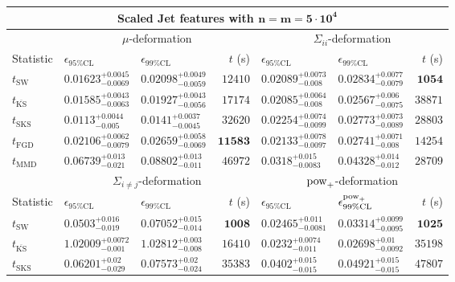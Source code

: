 \begin{tabular}{l|llr|llr}
	\toprule
	\multicolumn{7}{c}{{\bf Scaled Jet features with $\mathbf{n=m=5\cdot 10^{4}}$}} \\
	\toprule
	\multicolumn{1}{c}{} & \multicolumn{3}{c}{$\mu$-deformation} & \multicolumn{3}{c}{$\Sigma_{ii}$-deformation} \\
	Statistic & $\epsilon_{95\%\mathrm{CL}}$ & $\epsilon_{99\%\mathrm    {CL}}$ & $t$ (s) & $\epsilon_{95\%\mathrm{CL}}$ & $\epsilon_{99\%\mathrm{CL}}$ & $t$ (s) \\
	\midrule
	$t_{\mathrm{SW}}$ & $0.01623_{-0.0069}^{+0.0045}$ & $0.02098_{-0.0059}^{+0.0049}$ & $12410$ & $0.02089_{-0.008}^{+0.0073}$ & $0.02834_{-0.0079}^{+0.0077}$ & ${\mathbf{1054}}$ \\
	$t_{\overline{\mathrm{KS}}}$ & $0.01585_{-0.0063}^{+0.0043}$ & $0.01927_{-0.0056}^{+0.0043}$ & $17174$ & ${\mathbf{0.02085_{-0.008}^{+0.0064}}}$ & ${\mathbf{0.02567_{-0.0075}^{+0.006}}}$ & $38871$ \\
	$t_{\mathrm{SKS}}$ & ${\mathbf{0.0113_{-0.005}^{+0.0044}}}$ & ${\mathbf{0.0141_{-0.0045}^{+0.0037}}}$ & $32620$ & $0.02254_{-0.0099}^{+0.0074}$ & $0.02773_{-0.0089}^{+0.0073}$ & $28803$ \\
	$t_{\mathrm{FGD}}$ & $0.02106_{-0.0079}^{+0.0062}$ & $0.02659_{-0.0069}^{+0.0058}$ & ${\mathbf{11583}}$ & $0.02133_{-0.0097}^{+0.0078}$ & $0.02741_{-0.008}^{+0.0071}$ & $14254$ \\
	$t_{\mathrm{MMD}}$ & $0.06739_{-0.021}^{+0.013}$ & $0.08802_{-0.011}^{+0.013}$ & $46972$ & $0.0318_{-0.0083}^{+0.015}$ & $0.04328_{-0.012}^{+0.014}$ & $28709$ \\
	\toprule
	\multicolumn{1}{c}{} & \multicolumn{3}{c}{$\Sigma_{i\neq j}$-deformation} & \multicolumn{3}{c}{$\rm{pow}_{+}$-deformation} \\
	Statistic & $\epsilon_{95\%\mathrm{CL}}$ & $\epsilon_{99\%\mathrm{CL}}$ & $t$ (s) & $\epsilon_{95\%\mathrm{CL}}$ & $\epsilon^{\rm   {pow}_{+}}_{99\%\mathrm{CL}}$ & $t$ (s) \\
	\midrule
	$t_{\mathrm{SW}}$ & $0.0503_{-0.019}^{+0.016}$ & $0.07052_{-0.014}^{+0.015}$ & ${\mathbf{1008}}$ & $0.02465_{-0.0081}^{+0.011}$ & $0.03314_{-0.0095}^{+0.0099}$ & ${\mathbf{1025}}$ \\
	$t_{\overline{\mathrm{KS}}}$ & $1.02009_{-0.001}^{+0.0072}$ & $1.02812_{-0.008}^{+0.003}$ & $16410$ & $0.0232_{-0.011}^{+0.0074}$ & $0.02698_{-0.0092}^{+0.01}$ & $35198$ \\
	$t_{\mathrm{SKS}}$ & $0.06201_{-0.029}^{+0.02}$ & $0.07573_{-0.024}^{+0.02}$ & $35383$ & $0.0402_{-0.015}^{+0.015}$ & $0.04921_{-0.015}^{+0.015}$ & $47807$ \\

\end{tabular}
